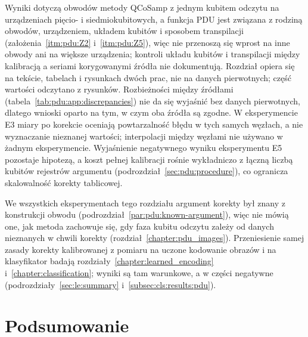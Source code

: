 Wyniki dotyczą obwodów metody QCoSamp z jednym kubitem odczytu na urządzeniach pięcio- i siedmiokubitowych, a funkcja PDU jest związana z rodziną obwodów, urządzeniem, układem kubitów i sposobem transpilacji (założenia~\ref{itm:pdu:Z2} i~\ref{itm:pdu:Z5}), więc nie przenoszą się wprost na inne obwody ani na większe urządzenia; kontroli układu kubitów i transpilacji między kalibracją a seriami korygowanymi źródła nie dokumentują.
Rozdział opiera się na tekście, tabelach i rysunkach dwóch prac, nie na danych pierwotnych; część wartości odczytano z rysunków.
Rozbieżności między źródłami (tabela~\ref{tab:pdu:app:discrepancies}) nie da się wyjaśnić bez danych pierwotnych, dlatego wnioski oparto na tym, w czym oba źródła są zgodne.
W eksperymencie E3 miary po korekcie oceniają powtarzalność błędu w tych samych węzłach, a nie wyznaczanie nieznanej wartości; interpolacji między węzłami nie używano w żadnym eksperymencie.
Wyjaśnienie negatywnego wyniku eksperymentu E5 pozostaje hipotezą, a koszt pełnej kalibracji rośnie wykładniczo z łączną liczbą kubitów rejestrów argumentu (podrozdział~\ref{sec:pdu:procedure}), co ogranicza skalowalność korekty tablicowej.

We wszystkich eksperymentach tego rozdziału argument korekty był znany z konstrukcji obwodu (podrozdział~\ref{par:pdu:known-argument}), więc nie mówią one, jak metoda zachowuje się, gdy faza kubitu odczytu zależy od danych nieznanych w chwili korekty (rozdział~\ref{chapter:pdu_images}).
Przeniesienie samej zasady korekty kalibrowanej z pomiaru na uczone kodowanie obrazów i na klasyfikator badają rozdziały~\ref{chapter:learned_encoding} i~\ref{chapter:classification}; wyniki są tam warunkowe, a w części negatywne (podrozdziały~\ref{sec:le:summary} i~\ref{subsec:cls:results:pdu}).

\section{Podsumowanie}\label{sec:pdu:summary}

